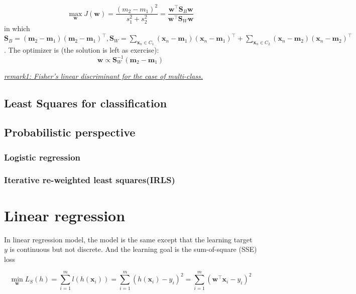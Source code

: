 \documentclass{article}
\begin{document}
	\begin{equation}
	\max_\mathbf{w} J(\mathbf{w}) = \frac{(m_2-m_1)^2}{s_1^2+s_2^2} 
	= \frac{\mathbf{w}^\top \mathbf{S}_B \mathbf{w}}{\mathbf{w}^\top \mathbf{S}_W \mathbf{w}}
	\end{equation}
in which $\mathbf{S}_B=(\mathbf{m}_2-\mathbf{m}_1)(\mathbf{m}_2-\mathbf{m}_1)^\top, \mathbf{S}_W=\sum_{\mathbf{x}_n\in C_1}(\mathbf{x}_n-\mathbf{m}_1)(\mathbf{x}_n-\mathbf{m}_1)^\top + \sum_{\mathbf{x}_n\in C_2}(\mathbf{x}_n-\mathbf{m}_2)(\mathbf{x}_n-\mathbf{m}_2)^\top$. The optimizer is (the solution is left as exercise):
	\begin{equation*}
	\mathbf{w}\propto \mathbf{S}_W^{-1} (\mathbf{m}_2-\mathbf{m}_1)
	\end{equation*}
	
	\textit{\underline{remark1: Fisher's linear discriminant for the case of multi-class.}}
	
	\subsection{Least Squares for classification}
	
	\subsection{Probabilistic perspective}
	
	\subsubsection{Logistic regression}
	
	\subsubsection{Iterative re-weighted least squares(IRLS)}

\section{Linear regression}

	In linear regression model, the model is the same except that the learning target $y$ is continuous but not discrete. And the learning goal is the sum-of-square (SSE) loss

	\begin{equation}
	\min_\mathbf{w} L_S(h) =\sum_{i=1}^m  l(h(\mathbf{x}_i)) = \sum_{i=1}^m (h(\mathbf{x}_i) - y_i)^2 = \sum_{i=1}^m (\mathbf{w}^\top\mathbf{x}_i - y_i)^2 
	\end{equation}
\end{document}
